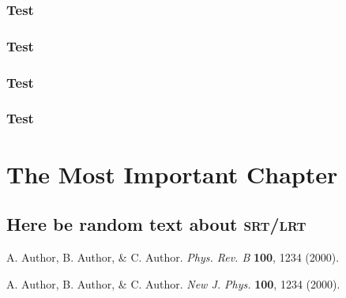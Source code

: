 \documentclass[b5paper,twoside,openright]{scrbook}
\begin{document}
\subsection{Test}
\subsection{Test}
\subsection{Test}
\subsection{Test}

\chapter{The Most Important Chapter}
\section{Here be random text about \textsc{srt/lrt}}








\backmatter
\begin{thebibliography}{999}
  A. Author, B. Author, \& C. Author.
  \textit{Phys. Rev. B} \textbf{100}, 1234 (2000).

  A. Author, B. Author, \& C. Author.
  \textit{New J. Phys.} \textbf{100}, 1234 (2000).
\end{thebibliography}
\end{document}
